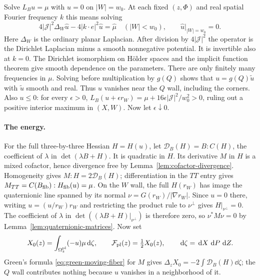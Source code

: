 Solve $L_Bu=\mu$ with $u=0$ on $|W|=w_0$. At each fixed $(z,\Phi)$ and
real spatial Fourier frequency $k$ this means solving
\[
 4|\mathcal J|^2\Delta_W\widehat u-4|k\cdot e|^2\widehat u=\widehat\mu
     \quad (|W|<w_0),\qquad \widehat u|_{|W|=w_0}=0.
\]
Here $\Delta_W$ is the ordinary planar Laplacian. After division by
$4|\mathcal J|^2$ the operator is the Dirichlet Laplacian minus a smooth
nonnegative potential. It is invertible also at $k=0$. The Dirichlet
isomorphism on H\"older spaces and the implicit function theorem give
smooth dependence on the parameters. There are only finitely many frequencies
in $\mu$. Solving before multiplication by $g(Q)$ shows that
$u=g(Q)\widetilde u$ with $\widetilde u$ smooth and real. Thus $u$
vanishes near the $Q$ wall, including the corners. Also $u\le0$:
for every $\epsilon>0$, $L_B(u+\epsilon r_W)=\mu+
16\epsilon |\mathcal J|^2/w_0^2>0$, ruling out a positive interior maximum in
$(X,W)$. Now let $\epsilon\downarrow0$.

\paragraph{The energy.}
For the full three-by-three Hessian $H=H(u)$, let
$\mathcal D_B(H)=B:C(H)$, the coefficient of $\lambda$ in
$\det(\lambda B+H)$. It is quadratic in $H$. Its derivative $M$ in
$H$ is a mixed cofactor, hence divergence free by
Lemma~\ref{lem:cofactor-divergence}. Homogeneity gives
$M:H=2\mathcal D_B(H)$; differentiation in the $TT$ entry gives
$M_{TT}=C(B_{\rm fib}):H_{\rm fib}(u)=\mu$.
On the $W$ wall, the full $H(r_W)$ has image the quaternionic line
spanned by its normal $\nu=G(r_W)/|\nabla r_W|$. Since $u=0$ there,
writing $u=(u/r_W)r_W$ and restricting the product rule to $\nu^\perp$
gives $H|_{\nu^\perp}=0$. The coefficient of $\lambda$ in
$\det((\lambda B+H)|_{\nu^\perp})$ is therefore zero, so
$\nu^*M\nu=0$ by Lemma~\ref{lem:quaternionic-matrices}. Now set
\[
 X_0(z)=\int_{\Omega_z^{\rm pl}}(-u)\mu\,\mathrm d\zeta,\qquad
 \mathcal F_{\rm pl}(z)=\tfrac12 X_0(z),\qquad \,\mathrm d\zeta=\,\mathrm d X\,\,\mathrm d P\,\,\mathrm d Z.
\]
Green's formula \eqref{eq:green-moving-fiber} for $M$ gives
$\Delta_zX_0=-2\int\mathcal D_B(H)\dd\zeta$; the $Q$ wall contributes
nothing because $u$ vanishes in a neighborhood of it.

